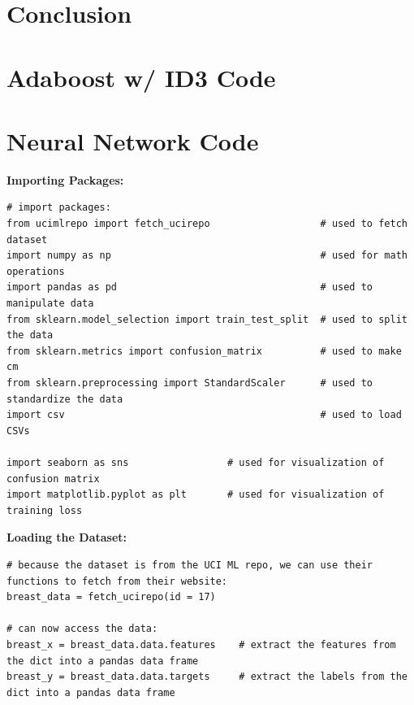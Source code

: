 \documentclass[a4paper]{article}
\begin{document}
\newpage
\section{Conclusion}

\newpage



\renewcommand{\thesection}{Appendix \Alph{section}: \hspace{-4mm}}
\setcounter{section}{0} %

\newpage
\section{Adaboost w/ ID3 Code}

\newpage
\section{Neural Network Code}
\textbf{Importing Packages:}
\begin{lstlisting}[basicstyle= \scriptsize]
# import packages:
from ucimlrepo import fetch_ucirepo                   # used to fetch dataset
import numpy as np                                    # used for math operations
import pandas as pd                                   # used to manipulate data
from sklearn.model_selection import train_test_split  # used to split the data
from sklearn.metrics import confusion_matrix          # used to make cm
from sklearn.preprocessing import StandardScaler      # used to standardize the data
import csv                                            # used to load CSVs

import seaborn as sns                 # used for visualization of confusion matrix
import matplotlib.pyplot as plt       # used for visualization of training loss
\end{lstlisting} 

\textbf{Loading the Dataset:}
\begin{lstlisting}[basicstyle= \scriptsize]
# because the dataset is from the UCI ML repo, we can use their functions to fetch from their website:
breast_data = fetch_ucirepo(id = 17)

# can now access the data:
breast_x = breast_data.data.features    # extract the features from the dict into a pandas data frame
breast_y = breast_data.data.targets     # extract the labels from the dict into a pandas data frame
\end{lstlisting}
\end{document}
